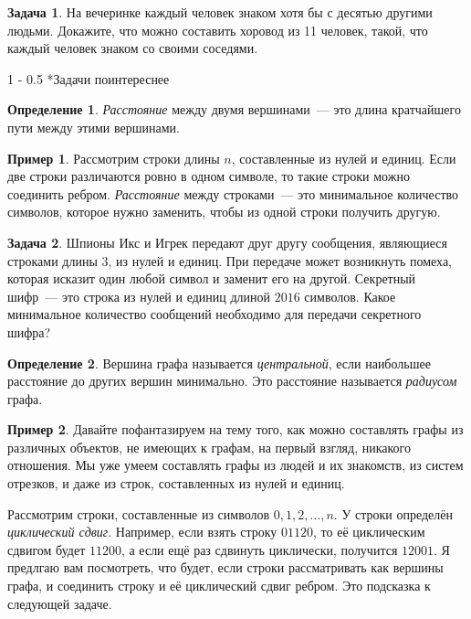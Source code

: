\documentclass{article}
\makeatletter
\theoremstyle{definition}
\newtheorem{problem}{Задача}
\newtheorem*{example}{Пример}
\newtheorem*{definition}{Определение}
\renewcommand{\section}{\@startsection
{section}%
{1}%
{\z@}%
{-\baselineskip}%
{0.5\baselineskip}%
{\centering\large\scshape}} %
\makeatother
\begin{document}
\begin{problem}
	На вечеринке каждый человек знаком хотя бы с десятью другими людьми. 
	Докажите, что можно составить хоровод из 11 человек, такой, что каждый 
	человек знаком со своими соседями.
\end{problem}

\section*{Задачи поинтереснее}

\begin{definition}
	\textit{Расстояние} между двумя вершинами~--- это длина кратчайшего пути 
	между этими вершинами.
\end{definition}

\begin{example}
	Рассмотрим строки длины \( n \), составленные из нулей и единиц. Если две 
	строки различаются ровно в одном символе, то такие строки можно соединить 
	ребром. \textit{Расстояние} между строками~--- это минимальное количество 
	символов, которое нужно заменить, чтобы из одной строки получить другую.
\end{example}

\begin{problem}
	Шпионы Икс и Игрек передают друг другу сообщения, являющиеся строками длины 
	\( 3 \), из нулей и единиц. При передаче может возникнуть помеха, которая 
	исказит один любой символ и заменит его на другой. Секретный шифр~--- это 
	строка из нулей и единиц длиной \( 2016 \) символов. Какое минимальное 
	количество сообщений необходимо для передачи секретного шифра?
\end{problem}

\begin{definition}
	Вершина графа называется \textit{центральной}, если наибольшее расстояние 
	до других вершин минимально. Это расстояние называется \textit{радиусом} 
	графа.
\end{definition}

\begin{example}
	Давайте пофантазируем на тему того, как можно составлять графы из различных 
	объектов, не имеющих к графам, на первый взгляд, никакого отношения. Мы уже 
	умеем составлять графы из людей и их знакомств, из систем отрезков, и даже 
	из строк, составленных из нулей и единиц.
	
	Рассмотрим строки, составленные из символов \( 0, 1, 2, \ldots, n \). У 
	строки определён \textit{циклический сдвиг}. Например, если взять строку \( 
	01120 \), то её циклическим сдвигом будет \( 11200 \), а если ещё раз 
	сдвинуть циклически, получится \( 12001 \). Я предлгаю вам посмотреть, что 
	будет, если строки рассматривать как вершины графа, и соединить строку и её 
	циклический сдвиг ребром. Это подсказка к следующей задаче.
\end{example}
\end{document}
